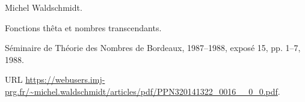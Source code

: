 Michel Waldschmidt.

\newblock Fonctions th\^eta et nombres transcendants.

\newblock S\'eminaire de Th\'eorie des Nombres de Bordeaux, 1987--1988,
  expos\'e 15, pp. 1--7, 1988{}.

\newblock URL
  \url{https://webusers.imj-prg.fr/~michel.waldschmidt/articles/pdf/PPN320141322_0016__0_0.pdf}.